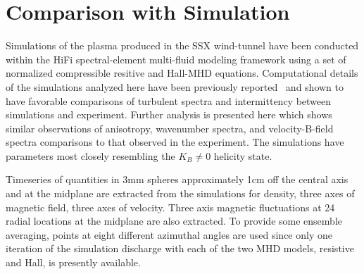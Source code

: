 \documentclass[aip,prl,amsmath,amssymb,reprint,superscriptaddress]{revtex4-1} %
\begin{document}
\section{Comparison with Simulation}\label{sec:simulation}

Simulations of the plasma produced in the SSX wind-tunnel have been conducted within the HiFi spectral-element multi-fluid modeling framework using a set of normalized compressible resitive and Hall-MHD equations. Computational details of the simulations analyzed here have been previously reported~\cite{schaffner14a} and shown to have favorable comparisons of turbulent spectra and intermittency between simulations and experiment. Further analysis is presented here which shows similar observations of anisotropy, wavenumber spectra, and velocity-B-field spectra comparisons to that observed in the experiment. The simulations have parameters most closely resembling the $K_{B}\neq 0$ helicity state. 

Timeseries of quantities in 3mm spheres approximately 1cm off the central axis and at the midplane are extracted from the simulations for density, three axes of magnetic field, three axes of velocity. Three axis magnetic fluctuations at 24 radial locations at the midplane are also extracted. To provide some ensemble averaging, points at eight different azimuthal angles are used since only one iteration of the simulation discharge with each of the two MHD models, resistive and Hall, is presently available.
\end{document}
